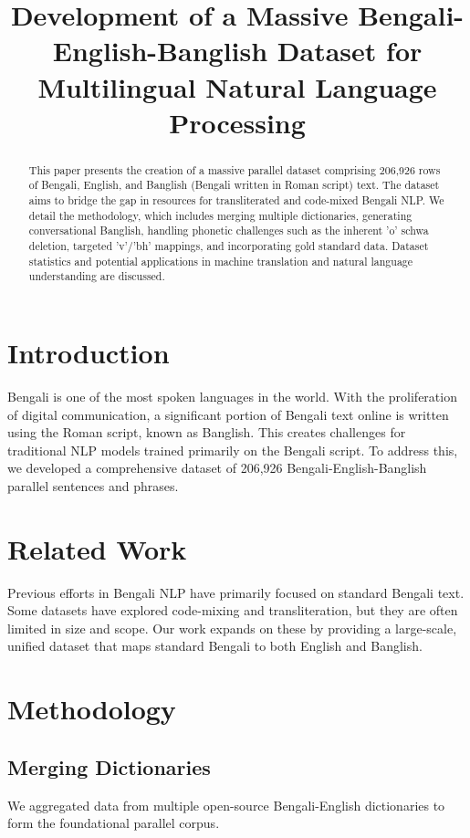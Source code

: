 \documentclass[conference]{IEEEtran}
\begin{document}
\title{Development of a Massive Bengali-English-Banglish Dataset for Multilingual Natural Language Processing}

\author{}

\maketitle

\begin{abstract}
This paper presents the creation of a massive parallel dataset comprising 206,926 rows of Bengali, English, and Banglish (Bengali written in Roman script) text. The dataset aims to bridge the gap in resources for transliterated and code-mixed Bengali NLP. We detail the methodology, which includes merging multiple dictionaries, generating conversational Banglish, handling phonetic challenges such as the inherent 'o' schwa deletion, targeted 'v'/'bh' mappings, and incorporating gold standard data. Dataset statistics and potential applications in machine translation and natural language understanding are discussed.
\end{abstract}

\section{Introduction}
Bengali is one of the most spoken languages in the world. With the proliferation of digital communication, a significant portion of Bengali text online is written using the Roman script, known as Banglish. This creates challenges for traditional NLP models trained primarily on the Bengali script. To address this, we developed a comprehensive dataset of 206,926 Bengali-English-Banglish parallel sentences and phrases.

\section{Related Work}
Previous efforts in Bengali NLP have primarily focused on standard Bengali text. Some datasets have explored code-mixing and transliteration, but they are often limited in size and scope. Our work expands on these by providing a large-scale, unified dataset that maps standard Bengali to both English and Banglish.

\section{Methodology}
\subsection{Merging Dictionaries}
We aggregated data from multiple open-source Bengali-English dictionaries to form the foundational parallel corpus.
\end{document}
